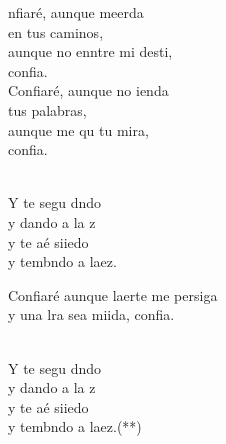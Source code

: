 \begin{cancion}[Confiaré][]%
	nfiaré, aunque meerda \\
	\jump
en tus caminos,\\
	aunque no enntre mi desti, \\
	confia.\\
	Confiaré, aunque no ienda \\
	\jump
tus palabras,\\
	aunque me qu tu mira, \\
	confia.\\
	\jumjump\\
	\begin{chorus}%
		Y te segu dndo \\
		y dando a la z\\
		y te aé siiedo \\
		y tembndo a laez.\jump\\
	\end{chorus}%
	Confiaré aunque laerte me persiga\\
	y una lra sea miida, confia.\\
	\jumjump\\
	\begin{chorus}%
		Y te segu dndo \\
		y dando a la \chord{Mi}{}{ve}z\\
		y te aé siiedo \\
		y tembndo a laez.(**)\jump\\
	\end{chorus}%
\end{cancion}%
